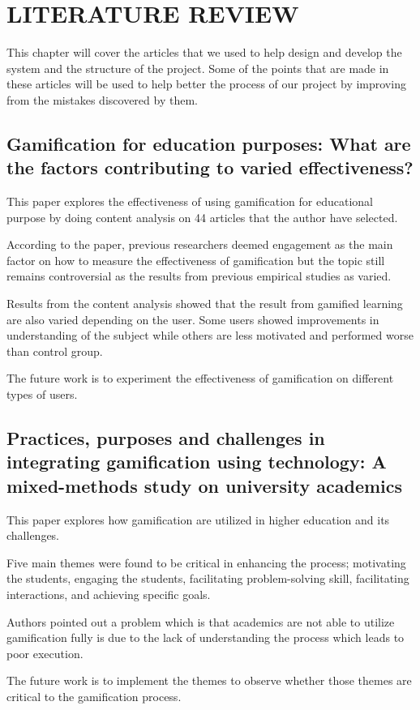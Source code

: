 \chapter{LITERATURE REVIEW}

This chapter will cover the articles that we used to help design and develop the system and the structure of the project. Some of the points that are made in these articles will be used to help better the process of our project by improving from the mistakes discovered by them.

\section{Gamification for education purposes: What are the factors contributing to varied effectiveness? \cite{paper_1}}
This paper explores the effectiveness of using gamification for educational purpose by doing content analysis on 44 articles that the author have selected.

According to the paper, previous researchers deemed engagement as the main factor on how to measure the effectiveness of gamification but the topic still remains controversial as the results from previous empirical studies as varied.

Results from the content analysis showed that the result from gamified learning are also varied depending on the user. Some users showed improvements in understanding of the subject while others are less motivated and performed worse than control group.

The future work is to experiment the effectiveness of gamification on different types of users.

\newpage
\section{Practices, purposes and challenges in integrating gamification using technology: A mixed-methods study on university academics \cite{paper_2}}
This paper explores how gamification are utilized in higher education and its challenges.

Five main themes were found to be critical in enhancing the process; motivating the students, engaging the students, facilitating problem-solving skill, facilitating interactions, and achieving specific goals.

Authors pointed out a problem which is that academics are not able to utilize gamification fully is due to the lack of understanding the process which leads to poor execution.

The future work is to implement the themes to observe whether those themes are critical to the gamification process.